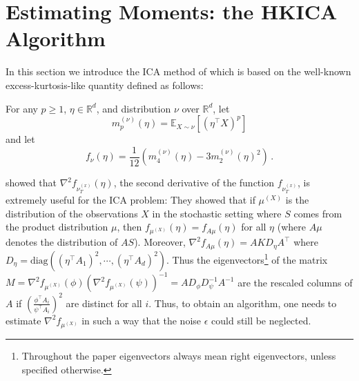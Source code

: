 \documentclass[twoside,11pt]{article}
\newcommand{\E}{\mathbb{E}}
\newcommand{\real}{\mathbb{R}}
\newcommand{\R}{\real}
\begin{document}
\section{Estimating Moments: the HKICA Algorithm}
\label{sec:HKICA}
In this section we introduce the ICA method of \citet{hsu2013learning} which is based on the well-known excess-kurtosis-like quantity
defined as follows:

For any $p\ge 1$, $\eta\in \real^d$, and distribution $\nu$ over $\R^d$,
let 
\begin{equation}
\label{eq:momnent}
m_p^{(\nu)}(\eta) = \E_{X\sim \nu}[ (\eta^\top X)^p ]
\end{equation}
and let
\begin{equation}
\label{eq:funcf}
f_{\nu}(\eta) = \frac1{12} \left( m_4^{(\nu)}(\eta) - 3 m_2^{(\nu)}(\eta)^2 \right)\,.
\end{equation}

\citet{hsu2013learning} showed that $\nabla^2f_{\nu_T^{(x)}}(\eta)$, the second derivative of the function $f_{\nu_T^{(x)}}$, is extremely useful for the ICA problem:
They showed that if $\mu^{(X)}$ is the distribution of the observations $X$ in the stochastic setting where $S$ comes from the product distribution $\mu$, then
$f_{\mu^{(X)}}(\eta)=f_{A\mu}(\eta)$ for all $\eta$ (where $A\mu$ denotes the distribution of $AS$). 
Moreover, $\nabla^2 f_{A\mu}(\eta)=A K D_{\eta} A^\top$ where $D_{\eta}=\text{diag}\left((\eta^{\top}A_1)^2,\cdots, (\eta^{\top}A_d)^2\right)$.
 Thus the eigenvectors\footnote{Throughout the paper eigenvectors always mean right eigenvectors, unless specified otherwise.} of the matrix $M=\nabla^2f_{\mu^{(X)}}(\phi)(\nabla^2f_{\mu^{(X)}}(\psi))^{-1} = AD_{\phi}D_{\psi}^{-1}A^{-1}$ are the rescaled columns of $A$ if $\left(\frac{\phi^\top A_i}{\psi^\top A_i}\right)^2$ are distinct for all $i$. Thus, to obtain an algorithm, one needs to estimate $\nabla^2 f_{\mu^{(X)}}$ in such a way that the noise $\epsilon$ could still be neglected.
\end{document}
